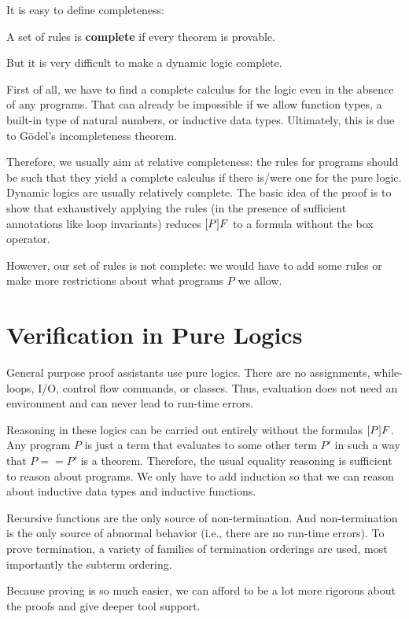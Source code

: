 It is easy to define completeness:

\begin{definition}[Completeness]
A set of rules is \textbf{complete} if every theorem is provable.
\end{definition}

But it is very difficult to make a dynamic logic complete.

First of all, we have to find a complete calculus for the logic even in the absence of any programs.
That can already be impossible if we allow function types, a built-in type of natural numbers, or inductive data types.
Ultimately, this is due to G\"odel's incompleteness theorem.

Therefore, we usually aim at relative completeness: the rules for programs should be such that they yield a complete calculus if there is/were one for the pure logic.
Dynamic logics are usually relatively complete.
The basic idea of the proof is to show that exhaustively applying the rules (in the presence of sufficient annotations like loop invariants) reduces $[P]F$ to a formula without the box operator.

However, our set of rules is not complete: we would have to add some rules or make more restrictions about what programs $P$ we allow.

\section{Verification in Pure Logics}

General purpose proof assistants use pure logics.
There are no assignments, while-loops, I/O, control flow commands, or classes.
Thus, evaluation does not need an environment and can never lead to run-time errors.

Reasoning in these logics can be carried out entirely without the formulas $[P]F$.
Any program $P$ is just a term that evaluates to some other term $P'$ in such a way that $P==P'$ is a theorem.
Therefore, the usual equality reasoning is sufficient to reason about programs.
We only have to add induction so that we can reason about inductive data types and inductive functions.

Recursive functions are the only source of non-termination.
And non-termination is the only source of abnormal behavior (i.e., there are no run-time errors).
To prove termination, a variety of families of termination orderings are used, most importantly the subterm ordering.

Because proving is so much easier, we can afford to be a lot more rigorous about the proofs and give deeper tool support.

